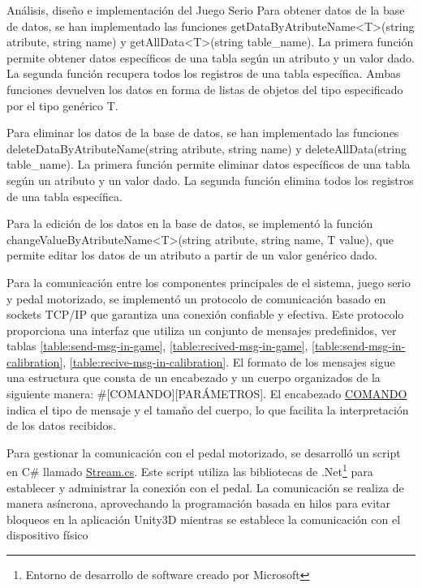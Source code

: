 \begin{thesischapter}{2} {Análisis, diseño e implementación del Juego Serio}
Para obtener datos de la base de datos, se han implementado las funciones getDataByAtributeName<T>(string atribute, string name) y getAllData<T>(string table\_name). 
La primera función permite obtener datos específicos de una tabla según un atributo y un valor dado. La segunda función recupera todos los registros de una tabla específica. 
Ambas funciones devuelven los datos en forma de listas de objetos del tipo especificado por el tipo genérico T.

Para eliminar los datos de la base de datos, se han implementado las funciones deleteDataByAtributeName(string atribute, string name) y deleteAllData(string table\_name). 
La primera función permite eliminar datos específicos de una tabla según un atributo y un valor dado. La segunda función elimina todos los registros de una tabla específica. 

Para la edición de los datos en la base de datos, se implementó la función changeValueByAtributeName<T>(string atribute, string name, T value), que 
permite editar los datos de un atributo a partir de un valor genérico dado.

Para la comunicación entre los componentes principales de el sistema, juego serio y pedal motorizado, se implementó un protocolo de comunicación basado en sockets TCP/IP que garantiza una conexión confiable y efectiva. Este protocolo proporciona una interfaz que utiliza un conjunto de mensajes predefinidos, ver tablas 
\ref{table:send-msg-in-game}, 
\ref{table:recived-msg-in-game}, 
\ref{table:send-msg-in-calibration}, 
\ref{table:recive-msg-in-calibration}. El formato de los mensajes sigue una estructura que consta de un encabezado y un cuerpo organizados de la siguiente manera: \#[COMANDO][PARÁMETROS]. El encabezado \underline{COMANDO} indica el tipo de mensaje y el tamaño del cuerpo, lo que facilita la interpretación de los datos recibidos.

\vspace{10pt} 
Para gestionar la comunicación con el pedal motorizado, se desarrolló un script en C\# llamado \underline{Stream.cs}. Este script utiliza las bibliotecas de .Net\footnote{Entorno de desarrollo de software creado por Microsoft} para establecer y administrar la conexión con el pedal. La comunicación se realiza de manera asíncrona, aprovechando la programación basada en hilos para evitar bloqueos en la aplicación Unity3D mientras se establece la comunicación con el dispositivo físico
    

\end{thesischapter}
